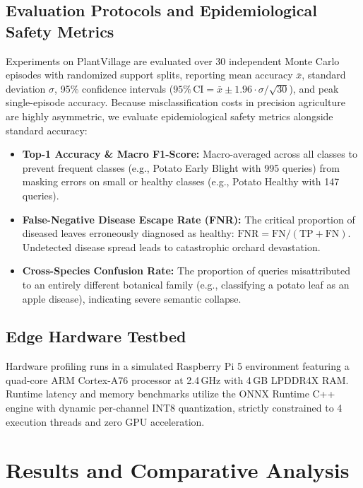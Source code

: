 \documentclass[a4paper,fleqn,nologo]{cas-dc}
\begin{document}
\subsection{Evaluation Protocols and Epidemiological Safety Metrics}
\label{sec:metrics}
Experiments on PlantVillage are evaluated over 30 independent Monte Carlo episodes with randomized support splits, reporting mean accuracy $\bar{x}$, standard deviation $\sigma$, 95\% confidence intervals ($95\%\,\text{CI} = \bar{x} \pm 1.96 \cdot \sigma / \sqrt{30}$), and peak single-episode accuracy. Because misclassification costs in precision agriculture are highly asymmetric, we evaluate epidemiological safety metrics alongside standard accuracy:
\begin{itemize}
    \item \textbf{Top-1 Accuracy \& Macro F1-Score:} Macro-averaged across all classes to prevent frequent classes (e.g., Potato Early Blight with 995 queries) from masking errors on small or healthy classes (e.g., Potato Healthy with 147 queries).
    \item \textbf{False-Negative Disease Escape Rate (FNR):} The critical proportion of diseased leaves erroneously diagnosed as healthy: $\text{FNR} = \text{FN} / (\text{TP} + \text{FN})$. Undetected disease spread leads to catastrophic orchard devastation.
    \item \textbf{Cross-Species Confusion Rate:} The proportion of queries misattributed to an entirely different botanical family (e.g., classifying a potato leaf as an apple disease), indicating severe semantic collapse.
\end{itemize}

\subsection{Edge Hardware Testbed}
Hardware profiling runs in a simulated Raspberry Pi 5 environment featuring a quad-core ARM Cortex-A76 processor at 2.4\,GHz with 4\,GB LPDDR4X RAM. Runtime latency and memory benchmarks utilize the ONNX Runtime C++ engine with dynamic per-channel INT8 quantization, strictly constrained to 4 execution threads and zero GPU acceleration.

\section{Results and Comparative Analysis}
\label{sec:results}
\end{document}

